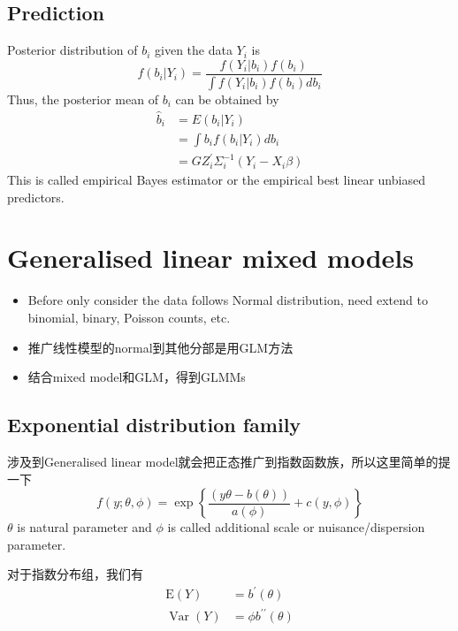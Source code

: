 \documentclass[
]{book}
\providecommand{\tightlist}{%
  \setlength{\itemsep}{0pt}\setlength{\parskip}{0pt}}
\theoremstyle{definition}
\theoremstyle{definition}
\theoremstyle{definition}
\theoremstyle{remark}
\begin{document}
\hypertarget{prediction}{%
\subsection{Prediction}\label{prediction}}

Posterior distribution of \(b_i\) given the data \(Y_i\) is
\[
f\left(b_{i} | Y_{i}\right)=\frac{f\left(Y_{i} | b_{i}\right) f\left(b_{i}\right)}{\int f\left(Y_{i} | b_{i}\right) f\left(b_{i}\right) d b_{i}}
\]
Thus, the posterior mean of \(b_i\) can be obtained by
\[
\begin{aligned} \hat{b}_{i} &=E\left(b_{i} | Y_{i}\right) \\ &=\int b_{i} f\left(b_{i} | Y_{i}\right) d b_{i} \\ &=G Z_{i}^{\prime} \Sigma_{i}^{-1}\left(Y_{i}-X_{i} \beta\right) \end{aligned}
\]
This is called empirical Bayes estimator or the empirical best linear unbiased predictors.

\hypertarget{generalised-linear-mixed-models}{%
\section{Generalised linear mixed models}\label{generalised-linear-mixed-models}}

\begin{itemize}
\tightlist
\item
  Before only consider the data follows Normal distribution, need extend to binomial, binary, Poisson counts, etc.
\item
  推广线性模型的normal到其他分部是用GLM方法
\item
  结合mixed model和GLM，得到GLMMs
\end{itemize}

\hypertarget{expFam}{%
\subsection{Exponential distribution family}\label{expFam}}

涉及到Generalised linear model就会把正态推广到指数函数族，所以这里简单的提一下
\[
f(y ; \theta, \phi)=\exp \left\{\frac{(y \theta-b(\theta))}{a(\phi)}+c(y, \phi)\right\}
\]
\(\theta\) is natural parameter and \(\phi\) is called additional scale or nuisance/dispersion parameter.

对于指数分布组，我们有
\[
\begin{aligned} \mathrm{E}(Y) &=b^{\prime}(\theta) \\ \operatorname{Var}(Y) &=\phi b^{\prime \prime}(\theta) \end{aligned}
\]
\end{document}
